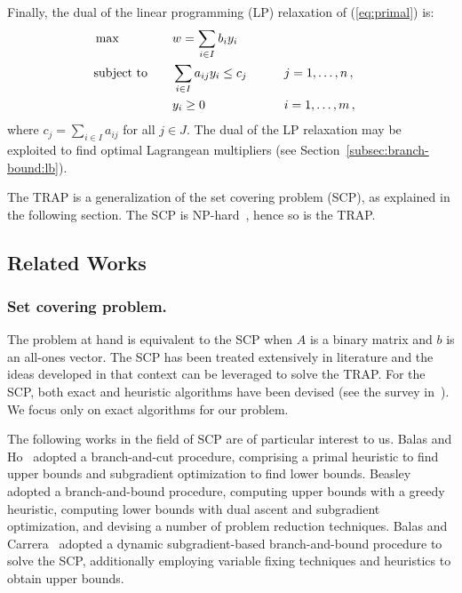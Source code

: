 \documentclass[runningheads]{llncs}
\begin{document}
Finally, the dual of the linear programming (LP) relaxation of (\ref{eq:primal}) is:
\begin{alignat}{3}
  &\max & \quad & w = \sum_{i \in I} b_i y_i \label{eq:dual}\\
  &\text{subject to}  &       & \sum_{i \in I} a_{ij} y_i \le c_j & \qquad & j = 1,\dots,n \, , \notag\\
  &                   &       & y_i \ge 0  &\qquad& i = 1,\dots,m \, , \notag
\end{alignat}
where $c_j = \sum_{i \in I} a_{ij}$ for all $j \in J$. The dual of the LP relaxation may be exploited to find optimal Lagrangean multipliers (see Section~\ref{subsec:branch-bound:lb}).

The TRAP is a generalization of the set covering problem (SCP), as explained in the following section. The SCP is NP-hard~\cite{caprara-2000-algorithms}, hence so is the TRAP.

\subsection{Related Works}
\label{subsec:problem:related_works}

\subsubsection{Set covering problem.} The problem at hand is equivalent to the SCP when $A$ is a binary matrix and $b$ is an all-ones vector. The SCP has been treated extensively in literature and the ideas developed in that context can be leveraged to solve the TRAP. For the SCP, both exact and heuristic algorithms have been devised (see the survey in~\cite{caprara-2000-algorithms}). We focus only on exact algorithms for our problem. 


The following works in the field of SCP are of particular interest to us. Balas and Ho~\cite{balas-ho-2009-set-covering} adopted a branch-and-cut procedure, comprising a primal heuristic to find upper bounds and subgradient optimization to find lower bounds.
Beasley~\cite{beasley-1987-algorithm} adopted a branch-and-bound procedure, computing upper bounds with a greedy heuristic, computing lower bounds with dual ascent and subgradient optimization, and devising a number of problem reduction techniques.
Balas and Carrera~\cite{balas-carrera-1996-dynamic} adopted a dynamic subgradient-based branch-and-bound procedure to solve the SCP, additionally employing variable fixing techniques and heuristics to obtain upper bounds.
\end{document}
